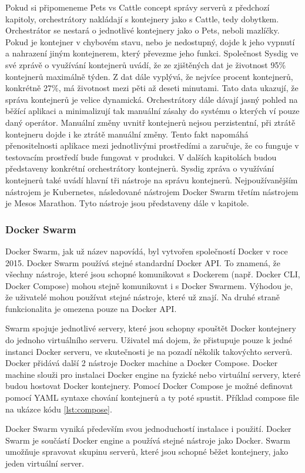    Pokud si připomeneme Pets vs Cattle concept správy serverů z předchozí kapitoly, orchestrátory nakládají s kontejnery jako s Cattle, tedy dobytkem. Orchestrátor se nestará o jednotlivé kontejnery jako o Pets, neboli mazlíčky. Pokud je kontejner v chybovém stavu, nebo je nedostupný, dojde k jeho vypnutí a nahrazení jiným kontejnerem, který převezme jeho funkci. Společnost Sysdig ve své zprávě o využívání kontejnerů \cite{sysdig} uvádí, že ze zjištěných dat je životnost 95\% kontejnerů maximálně týden. Z dat dále vyplývá, že nejvíce procent kontejnerů, konkrétně 27\%,  má životnost mezi pěti až deseti minutami. Tato data ukazují, že správa kontejnerů je velice dynamická. Orchestrátory dále dávají jasný pohled na běžící aplikaci a minimalizují tak manuální zásahy do systému o kterých ví pouze daný operátor. Manuální změny uvnitř kontejnerů nejsou perzistentní, při ztrátě kontejneru dojde i ke ztrátě manuální změny. Tento fakt napomáhá přenositelnosti aplikace mezi jednotlivými prostředími a zaručuje, že co funguje v testovacím prostředí bude fungovat v produkci. V dalších kapitolách budou představeny konkrétní orchestrátory kontejnerů. Sysdig zpráva o využívání kontejnerů \cite{sysdig} také uvádí hlavní tři nástroje na správu kontejnerů. Nejpoužívanějším nástrojem je Kubernetes, následované nástrojem Docker Swarm třetím nástrojem je Mesos Marathon. Tyto nástroje jsou představeny dále v kapitole.

 \subsubsection{Docker Swarm}
 Docker Swarm, jak už název napovídá, byl vytvořen společností Docker v roce 2015. Docker Swarm používá stejné standardní Docker API. To znamená, že všechny nástroje, které jsou schopné komunikovat s Dockerem (např. Docker CLI, Docker Compose) mohou stejně komunikovat i s Docker Swarmem. Výhodou je, že uživatelé mohou používat stejné nástroje, které už znají. Na druhé straně funkcionalita je omezena pouze na Docker API. \par
     Swarm spojuje jednotlivé servery, které jsou schopny spouštět Docker kontejnery do jednoho virtuálního serveru. Uživatel má dojem, že přistupuje pouze k jedné instanci Docker serveru, ve skutečnosti je na pozadí několik takovýchto serverů. Docker přidává další 2 nástroje Docker machine a Docker Compose. Docker machine slouži pro instalaci Docker engine na fyzické nebo virtuální servery, které budou hostovat Docker kontejnery. Pomocí Docker Compose je možné definovat pomocí YAML syntaxe chování kontejnerů a ty poté spustit. Příklad compose file na ukázce kódu \ref{lst:compose}.\par
         Docker Swarm vyniká především svou jednoduchostí instalace i použití. Docker Swarm je součástí Docker engine a používá stejné nástroje jako Docker. Swarm \linebreak umožňuje spravovat skupinu serverů, které jsou schopné běžet kontejnery, jako jeden virtuální server.

